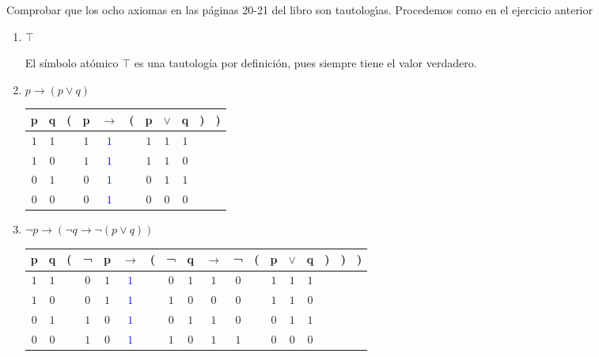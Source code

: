 \begin{problem}[7]
Comprobar que los ocho axiomas en las p\'aginas 20-21 del libro son tautolog\'{\i}as.
\solution
Procedemos como en el ejercicio anterior
\begin{enumerate}
\item \textbf{$\top$}

El símbolo atómico $\top$ es una tautología por definición, pues siempre tiene el valor verdadero.


\item \textbf{$p → (p ∨ q)$}
\begin{center}

\begin{tabular}{|@{ }c@{ }@{ }c | c@{}@{ }c@{ }@{ }c@{ }@{}c@{}@{ }c@{ }@{ }c@{ }@{ }c@{ }@{}c@{}@{}c@{ }|}\hline
p & q & ( & p & $\rightarrow$ & ( & p & $\lor$ & q & ) & )\\
\hline
$1$ & $1$ &  & $1$ & \textcolor{blue}{$1$} &  & $1$ & $1$ & $1$ &  & \\\hline
$1$ & $0$ &  & $1$ & \textcolor{blue}{$1$} &  & $1$ & $1$ & $0$ &  & \\\hline
$0$ & $1$ &  & $0$ & \textcolor{blue}{$1$} &  & $0$ & $1$ & $1$ &  & \\\hline
$0$ & $0$ &  & $0$ & \textcolor{blue}{$1$} &  & $0$ & $0$ & $0$ &  & \\\hline
\end{tabular}

\end{center}

\item \textbf{$¬p → (¬q → ¬(p ∨ q))$}
\begin{center}

\begin{tabular}{|@{ }c@{ }@{ }c | c@{}@{ }c@{ }@{ }c@{ }@{ }c@{ }@{}c@{}@{ }c@{ }@{ }c@{ }@{ }c@{ }@{ }c@{ }@{}c@{}@{ }c@{ }@{ }c@{ }@{ }c@{ }@{}c@{}@{}c@{}@{}c@{ }|}\hline
p & q & ( & ¬ & p & $\rightarrow$ & ( & ¬ & q & $\rightarrow$ & ¬ & ( & p & $\lor$ & q & ) & ) & )\\
\hline
$1$ & $1$ &  & $0$ & $1$ & \textcolor{blue}{$1$} &  & $0$ & $1$ & $1$ & $0$ &  & $1$ & $1$ & $1$ &  &  & \\\hline
$1$ & $0$ &  & $0$ & $1$ & \textcolor{blue}{$1$} &  & $1$ & $0$ & $0$ & $0$ &  & $1$ & $1$ & $0$ &  &  & \\\hline
$0$ & $1$ &  & $1$ & $0$ & \textcolor{blue}{$1$} &  & $0$ & $1$ & $1$ & $0$ &  & $0$ & $1$ & $1$ &  &  & \\\hline
$0$ & $0$ &  & $1$ & $0$ & \textcolor{blue}{$1$} &  & $1$ & $0$ & $1$ & $1$ &  & $0$ & $0$ & $0$ &  &  & \\\hline
\end{tabular}
\end{center}


\end{enumerate}
\end{problem}
